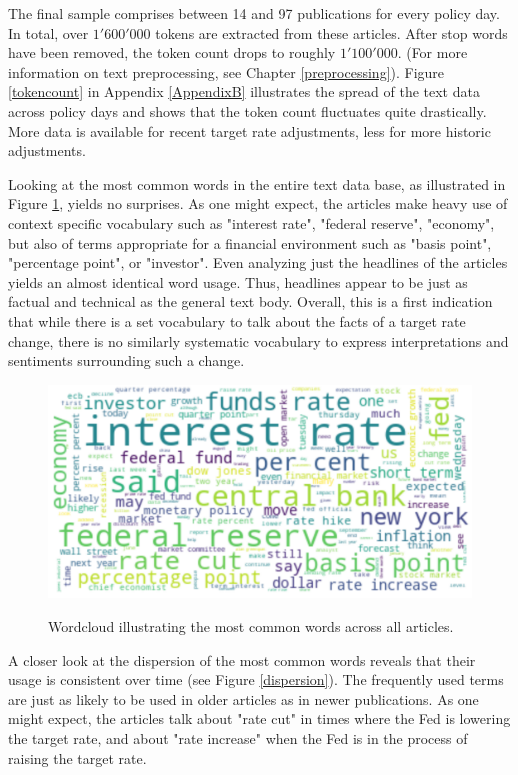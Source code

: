 \documentclass[11pt,a4paper,english,oneside]{book}
\numberwithin{equation}{chapter}
\begin{document}
The final sample comprises between 14 and 97 publications for every policy day. In total, over $1'600'000$ tokens are extracted from these articles. After stop words have been removed, the token count drops to roughly $1'100'000$. (For more information on text preprocessing, see Chapter \ref{preprocessing}). Figure \ref{tokencount} in Appendix \ref{AppendixB} illustrates the spread of the text data across policy days and shows that the token count fluctuates quite drastically. More data is available for recent target rate adjustments, less for more historic adjustments.

Looking at the most common words in the entire text data base, as illustrated in Figure \ref{wcloud}, yields no surprises. As one might expect, the articles make heavy use of context specific vocabulary such as "interest rate", "federal reserve", "economy", but also of terms appropriate for a financial environment such as "basis point", "percentage point", or "investor". Even analyzing just the headlines of the articles yields an almost identical word usage. Thus, headlines appear to be just as factual and technical as the general text body. Overall, this is a first indication that while there is a set vocabulary to talk about the facts of a target rate change, there is no similarly systematic vocabulary to express interpretations and sentiments surrounding such a change. 

\begin{figure}
	\caption{Wordcloud illustrating the most common words across all articles.}
	\centering
	\includegraphics[scale=0.2]{Images/wordcloud.pdf}
	\label{wcloud}
\end{figure}

A closer look at the dispersion of the most common words reveals that their usage is consistent over time (see Figure \ref{dispersion}). The frequently used terms are just as likely to be used in older articles as in newer publications. As one might expect, the articles talk about "rate cut" in times where the Fed is lowering the target rate, and about "rate increase" when the Fed is in the process of raising the target rate.
\end{document}
